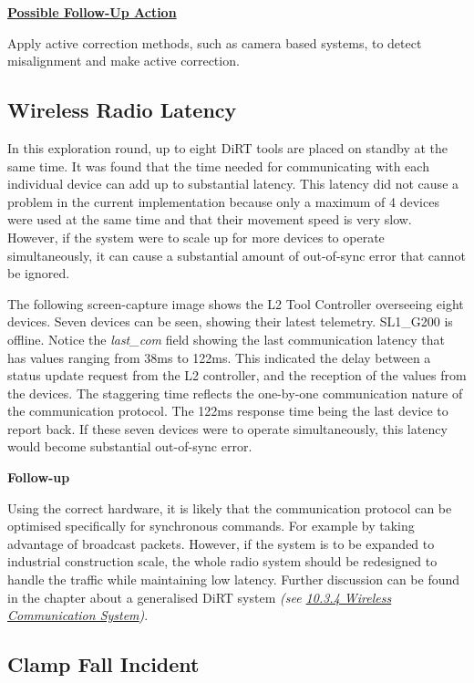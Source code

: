 


\textbf{\ul{Possible Follow-Up Action}}

Apply active correction methods, such as camera based systems, to detect misalignment and make active correction.

\subsection{Wireless Radio Latency}
\label{subsection:exploration_5_wireless_radio_latency}

In this exploration round, up to eight DiRT tools are placed on standby at the same time. It was found that the time needed for communicating with each individual device can add up to substantial latency. This latency did not cause a problem in the current implementation because only a maximum of 4 devices were used at the same time and that their movement speed is very slow. However, if the system were to scale up for more devices to operate simultaneously, it can cause a substantial amount of out-of-sync error that cannot be ignored.

The following screen-capture image shows the L2 Tool Controller overseeing eight devices. Seven devices can be seen, showing their latest telemetry. SL1\_G200 is offline. Notice the \textit{last\_com }field showing the last communication latency that has values ranging from 38ms to 122ms. This indicated the delay between a status update request from the L2 controller, and the reception of the values from the devices. The staggering time reflects the one-by-one communication nature of the communication protocol. The 122ms response time being the last device to report back. If these seven devices were to operate simultaneously, this latency would become substantial out-of-sync error. 




\textbf{Follow-up}

Using the correct hardware, it is likely that the communication protocol can be optimised specifically for synchronous commands. For example by taking advantage of broadcast packets. However, if the system is to be expanded to industrial construction scale, the whole radio system should be redesigned to handle the traffic while maintaining low latency. Further discussion can be found in the chapter about a generalised DiRT system \textit{(see \ul{10.3.4 Wireless Communication System})}. 

\subsection{Clamp Fall Incident}
\label{subsection:exploration_5_clamp_fall_incident}


